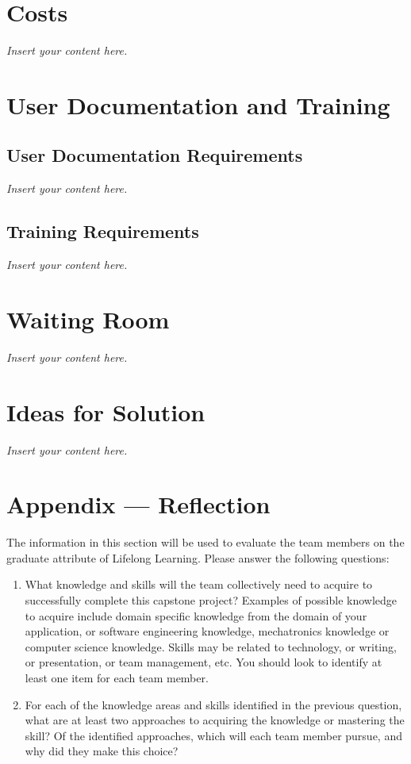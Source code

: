 \documentclass[12pt]{article}
\newcommand{\lips}{\textit{Insert your content here.}}
\begin{document}
\section{Costs}
\lips
\section{User Documentation and Training}
\subsection{User Documentation Requirements}
\lips
\subsection{Training Requirements}
\lips

\section{Waiting Room}
\lips

\section{Ideas for Solution}
\lips

\newpage{}
\section*{Appendix --- Reflection}

The information in this section will be used to evaluate the team members on the
graduate attribute of Lifelong Learning.  Please answer the following questions:

\begin{enumerate}
  \item What knowledge and skills will the team collectively need to acquire to
  successfully complete this capstone project?  Examples of possible knowledge
  to acquire include domain specific knowledge from the domain of your
  application, or software engineering knowledge, mechatronics knowledge or
  computer science knowledge.  Skills may be related to technology, or writing,
  or presentation, or team management, etc.  You should look to identify at
  least one item for each team member.
  \item For each of the knowledge areas and skills identified in the previous
  question, what are at least two approaches to acquiring the knowledge or
  mastering the skill?  Of the identified approaches, which will each team
  member pursue, and why did they make this choice?
\end{enumerate}
\end{document}
